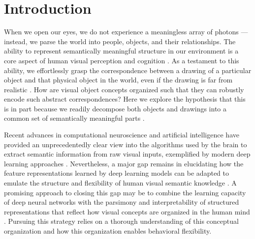 \documentclass[10pt,letterpaper]{article}
\begin{document}
\section{Introduction}


When we open our eyes, we do not experience a meaningless array of photons --- instead, we parse the world into people, objects, and their relationships. 
The ability to represent semantically meaningful structure in our environment is a core aspect of human visual perception and cognition \cite{navon1977forest}. 
As a testament to this ability, we effortlessly grasp the correspondence between a drawing of a particular object and that physical object in the world, even if the drawing is far from realistic \cite{eitz2012humans,FanCommon2018}. 
How are visual object concepts organized such that they can robustly encode such abstract correspondences?
Here we explore the hypothesis that this is in part because we readily decompose both objects and drawings into a common set of semantically meaningful parts \cite{biederman1988surface}. 

Recent advances in computational neuroscience and artificial intelligence have provided an unprecedentedly clear view into the algorithms used by the brain to extract semantic information from raw visual inputs, exemplified by modern deep learning approaches \cite{yamins2014performance}.
Nevertheless, a major gap remains in elucidating how the feature representations learned by deep learning models can be adapted to emulate the structure and flexibility of human visual semantic knowledge \cite{lake2017building}.
A promising approach to closing this gap may be to combine the learning capacity of deep neural networks with the parsimony and interpretability of structured representations that reflect how visual concepts are organized in the human mind \cite{battaglia2018relational}. 
Pursuing this strategy relies on a thorough understanding of this conceptual organization and how this organization enables behavioral flexibility.  
\end{document}
